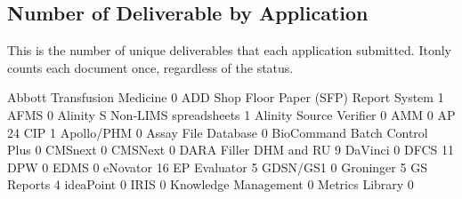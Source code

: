 \documentclass{article}
\begin{document}
\subsection{Number of Deliverable by Application}
This is the number of unique deliverables that each application submitted. Itonly counts
each document once, regardless of the status.
\begin{Schunk}
\begin{Soutput}
             Abbott Transfusion Medicine 
                                       0 
ADD Shop Floor Paper (SFP) Report System 
                                       1 
                                    AFMS 
                                       0 
         Alinity S Non-LIMS spreadsheets 
                                       1 
                 Alinity Source Verifier 
                                       0 
                                     AMM 
                                       0 
                               AP 24 CIP 
                                       1 
                              Apollo/PHM 
                                       0 
                     Assay File Database 
                                       0 
           BioCommand Batch Control Plus 
                                       0 
                                 CMSnext 
                                       0 
                                 CMSNext 
                                       0 
                  DARA Filler DHM and RU 
                                       9 
                                 DaVinci 
                                       0 
                                    DFCS 
                                      11 
                                     DPW 
                                       0 
                                    EDMS 
                                       0 
                                eNovator 
                                      16 
                            EP Evaluator 
                                       5 
                                GDSN/GS1 
                                       0 
                               Groninger 
                                       5 
                              GS Reports 
                                       4 
                               ideaPoint 
                                       0 
                                    IRIS 
                                       0 
                    Knowledge Management 
                                       0 
                         Metrics Library 
                                       0 

\end{Soutput}
\end{Schunk}
\end{document}
